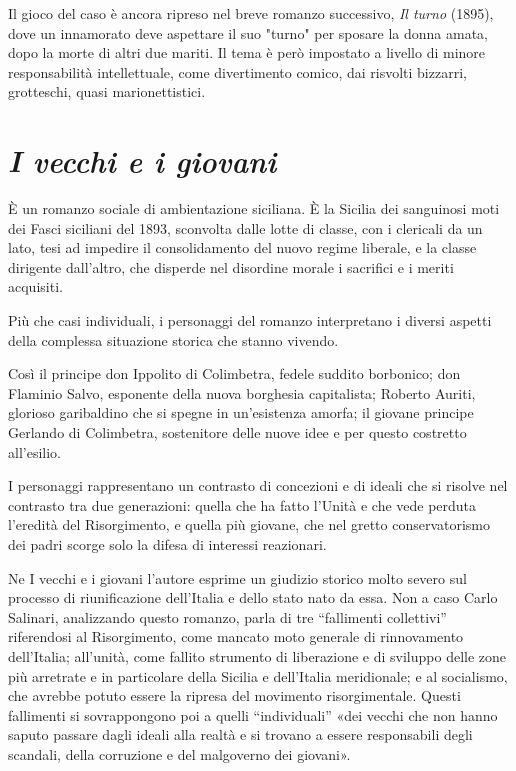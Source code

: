 Il gioco del caso è ancora ripreso nel breve romanzo successivo, \textit{Il turno} (1895), dove un innamorato deve aspettare il suo "turno" per sposare la donna amata, dopo la morte di altri due mariti. Il tema è però impostato a livello di minore responsabilità intellettuale, come divertimento comico, dai risvolti bizzarri, grotteschi, quasi marionettistici.

\chapter{\textit{I vecchi e i giovani}}

È un romanzo sociale di ambientazione siciliana. È la Sicilia dei sanguinosi moti dei Fasci siciliani del 1893, sconvolta dalle lotte di classe, con i clericali da un lato, tesi ad impedire il consolidamento del nuovo regime liberale, e la classe dirigente dall'altro, che disperde nel disordine morale i sacrifici e i meriti acquisiti.

Più che casi individuali, i personaggi del romanzo interpretano i diversi aspetti della complessa situazione storica che stanno vivendo.

Così il principe don Ippolito di Colimbetra, fedele suddito borbonico; don Flaminio Salvo, esponente della nuova borghesia capitalista; Roberto Auriti, glorioso garibaldino che si spegne in un'esistenza amorfa; il giovane principe Gerlando di Colimbetra, sostenitore delle nuove idee e per questo costretto all'esilio.

I personaggi rappresentano un contrasto di concezioni e di ideali che si risolve nel contrasto tra due generazioni: quella che ha fatto l'Unità e che vede perduta l'eredità del Risorgimento, e quella più giovane, che nel gretto conservatorismo dei padri scorge solo la difesa di interessi reazionari.

Ne I vecchi e i giovani l'autore esprime un giudizio storico molto severo sul processo di riunificazione dell'Italia e dello stato nato da essa. Non a caso Carlo Salinari, analizzando questo romanzo, parla di tre “fallimenti collettivi” riferendosi al Risorgimento, come mancato moto generale di rinnovamento dell'Italia; all'unità, come fallito strumento di liberazione e di sviluppo delle zone più arretrate e in particolare della Sicilia e dell'Italia meridionale; e al socialismo, che avrebbe potuto essere la ripresa del movimento risorgimentale. Questi fallimenti si sovrappongono poi a quelli “individuali” «dei vecchi che non hanno saputo passare dagli ideali alla realtà e si trovano a essere responsabili degli scandali, della corruzione e del malgoverno dei giovani».

